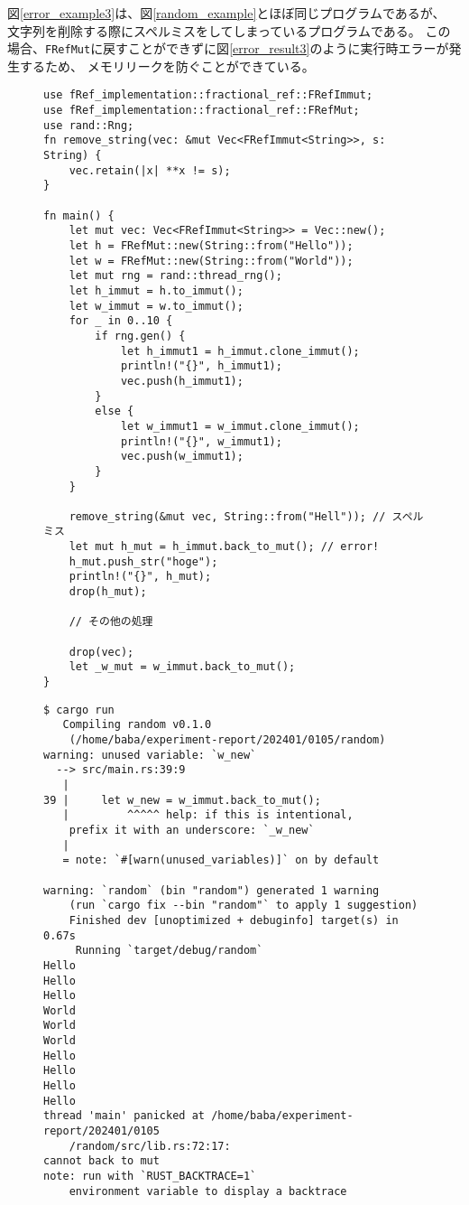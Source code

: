 \documentclass{sumiilab-paper}
\theoremstyle{mystyle}
\numberwithin{definition}{chapter} %
\begin{document}
図\ref{error_example3}は、図\ref{random_example}とほぼ同じプログラムであるが、
文字列を削除する際にスペルミスをしてしまっているプログラムである。
この場合、\texttt{FRefMut}に戻すことができずに図\ref{error_result3}のように実行時エラーが発生するため、
メモリリークを防ぐことができている。
\begin{figure}[p]
\begin{lstlisting}[caption=ユーザのミスを検出する例, 
  label=error_example3, captionpos=b]
use fRef_implementation::fractional_ref::FRefImmut;
use fRef_implementation::fractional_ref::FRefMut;
use rand::Rng;
fn remove_string(vec: &mut Vec<FRefImmut<String>>, s: String) {
    vec.retain(|x| **x != s);
}

fn main() {
    let mut vec: Vec<FRefImmut<String>> = Vec::new();
    let h = FRefMut::new(String::from("Hello"));
    let w = FRefMut::new(String::from("World"));
    let mut rng = rand::thread_rng();
    let h_immut = h.to_immut();
    let w_immut = w.to_immut();
    for _ in 0..10 {
        if rng.gen() {
            let h_immut1 = h_immut.clone_immut();
            println!("{}", h_immut1);
            vec.push(h_immut1);
        }
        else {
            let w_immut1 = w_immut.clone_immut();
            println!("{}", w_immut1);
            vec.push(w_immut1);
        }
    }

    remove_string(&mut vec, String::from("Hell")); // スペルミス
    let mut h_mut = h_immut.back_to_mut(); // error!
    h_mut.push_str("hoge");
    println!("{}", h_mut);
    drop(h_mut);

    // その他の処理

    drop(vec);
    let _w_mut = w_immut.back_to_mut();
}
\end{lstlisting}
\end{figure}
\begin{figure}[p]
\begin{lstlisting}[caption=ユーザのミスによるエラー, 
  label=error_result3, captionpos=b]
$ cargo run
   Compiling random v0.1.0 
    (/home/baba/experiment-report/202401/0105/random)
warning: unused variable: `w_new`
  --> src/main.rs:39:9
   |
39 |     let w_new = w_immut.back_to_mut();
   |         ^^^^^ help: if this is intentional,
    prefix it with an underscore: `_w_new`
   |
   = note: `#[warn(unused_variables)]` on by default

warning: `random` (bin "random") generated 1 warning 
    (run `cargo fix --bin "random"` to apply 1 suggestion)
    Finished dev [unoptimized + debuginfo] target(s) in 0.67s
     Running `target/debug/random`
Hello
Hello
Hello
World
World
World
Hello
Hello
Hello
Hello
thread 'main' panicked at /home/baba/experiment-report/202401/0105
    /random/src/lib.rs:72:17:
cannot back to mut
note: run with `RUST_BACKTRACE=1` 
    environment variable to display a backtrace
\end{lstlisting}
\end{figure}
\end{document}
